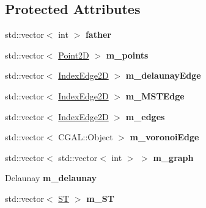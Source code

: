 \subsection*{Protected Attributes}
\begin{DoxyCompactItemize}
\item 
std\+::vector$<$ int $>$ {\bfseries father}\hypertarget{classcmst_1_1_graph2_d_ad5d251f2f6f8b827af4404985fcec53c}{}\label{classcmst_1_1_graph2_d_ad5d251f2f6f8b827af4404985fcec53c}

\item 
std\+::vector$<$ \hyperlink{classcmst_1_1_point2_d}{Point2D} $>$ {\bfseries m\+\_\+points}\hypertarget{classcmst_1_1_graph2_d_a32456f3c630e34a56ce3109183142c10}{}\label{classcmst_1_1_graph2_d_a32456f3c630e34a56ce3109183142c10}

\item 
std\+::vector$<$ \hyperlink{classcmst_1_1_index_edge2_d}{Index\+Edge2D} $>$ {\bfseries m\+\_\+delaunay\+Edge}\hypertarget{classcmst_1_1_graph2_d_a6fe64b2078ec3c700a8a2e2bd77e2dae}{}\label{classcmst_1_1_graph2_d_a6fe64b2078ec3c700a8a2e2bd77e2dae}

\item 
std\+::vector$<$ \hyperlink{classcmst_1_1_index_edge2_d}{Index\+Edge2D} $>$ {\bfseries m\+\_\+\+M\+S\+T\+Edge}\hypertarget{classcmst_1_1_graph2_d_a1cc96b5251162964ac21f46955ac8271}{}\label{classcmst_1_1_graph2_d_a1cc96b5251162964ac21f46955ac8271}

\item 
std\+::vector$<$ \hyperlink{classcmst_1_1_index_edge2_d}{Index\+Edge2D} $>$ {\bfseries m\+\_\+edges}\hypertarget{classcmst_1_1_graph2_d_a31a6b042c1c1941ee59672b842c7d3c9}{}\label{classcmst_1_1_graph2_d_a31a6b042c1c1941ee59672b842c7d3c9}

\item 
std\+::vector$<$ C\+G\+A\+L\+::\+Object $>$ {\bfseries m\+\_\+voronoi\+Edge}\hypertarget{classcmst_1_1_graph2_d_a05e5ea6746bfd9d0ccd47308f4bbf1af}{}\label{classcmst_1_1_graph2_d_a05e5ea6746bfd9d0ccd47308f4bbf1af}

\item 
std\+::vector$<$ std\+::vector$<$ int $>$ $>$ {\bfseries m\+\_\+graph}\hypertarget{classcmst_1_1_graph2_d_a5df9c78edb4f5c68da11b01e44061dc5}{}\label{classcmst_1_1_graph2_d_a5df9c78edb4f5c68da11b01e44061dc5}

\item 
Delaunay {\bfseries m\+\_\+delaunay}\hypertarget{classcmst_1_1_graph2_d_af19557df59901e6078c2038652c95623}{}\label{classcmst_1_1_graph2_d_af19557df59901e6078c2038652c95623}

\item 
std\+::vector$<$ \hyperlink{structcmst_1_1_graph2_d_1_1_s_t}{ST} $>$ {\bfseries m\+\_\+\+ST}\hypertarget{classcmst_1_1_graph2_d_a829dc681f90679478b0ba9676af0bc03}{}\label{classcmst_1_1_graph2_d_a829dc681f90679478b0ba9676af0bc03}

\end{DoxyCompactItemize}


